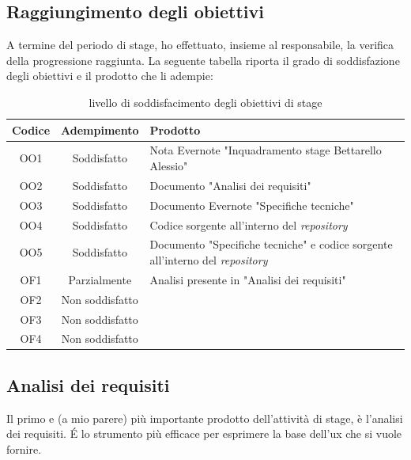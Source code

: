 \subsection{Raggiungimento degli obiettivi}
A termine del periodo di stage, ho effettuato, insieme al responsabile, la verifica della progressione raggiunta.
La seguente tabella riporta il grado di soddisfazione degli obiettivi e il prodotto che li adempie:

\begin{table}[H]
    \centering
    \begin{tabular}{|c|c|m{}|}
    \hline
        \textbf{Codice} & \textbf{Adempimento} & \textbf{Prodotto} \\ \hline
        \rowcolor{green!15}
        OO1 & Soddisfatto & Nota Evernote "Inquadramento stage Bettarello Alessio" \\ \hline
        \rowcolor{green!15}
        OO2 & Soddisfatto & Documento "Analisi dei requisiti" \\ \hline
        \rowcolor{green!15}
        OO3 & Soddisfatto & Documento Evernote "Specifiche tecniche" \\ \hline
        \rowcolor{green!15}
        OO4 & Soddisfatto & Codice sorgente all'interno del \textit{repository} \\ \hline
        \rowcolor{green!15}
        OO5 & Soddisfatto & Documento "Specifiche tecniche" e codice sorgente all'interno del
        \textit{repository} \\ \hline
        \rowcolor{orange!15}
        OF1 & Parzialmente & Analisi presente in "Analisi dei requisiti" \\ \hline
        \rowcolor{red!15}
        OF2 & Non soddisfatto & \\ \hline
        \rowcolor{red!15}
        OF3 & Non soddisfatto & \\ \hline
        \rowcolor{red!15}
        OF4 & Non soddisfatto & \\ \hline
    \end{tabular}
    \caption{livello di soddisfacimento degli obiettivi di stage}
    \label{tab:goalObiettivi}
\end{table}
\subsection{Analisi dei requisiti}
Il primo e (a mio parere) più importante prodotto dell'attività di stage, è l'analisi dei requisiti.
\'E lo strumento più efficace per esprimere la base dell'\acrshort{ux} che si vuole fornire.

